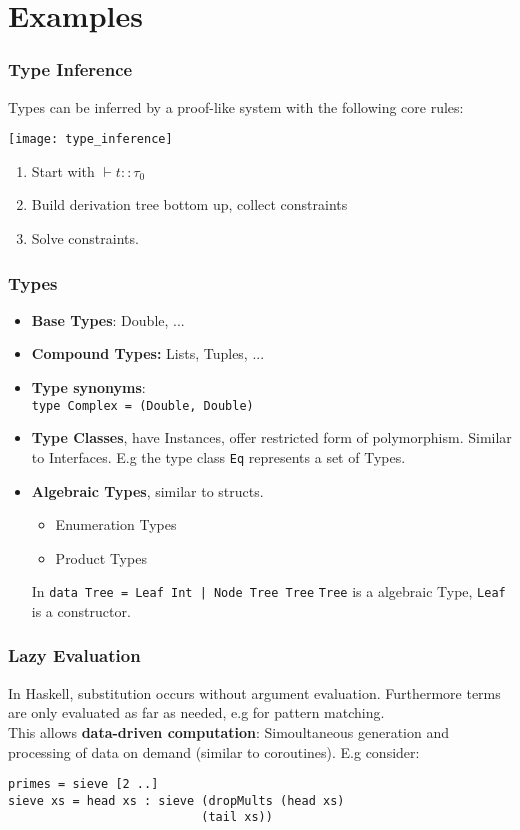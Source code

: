 \part{Examples}

\section{Type Inference}
Types can be inferred by a proof-like system with the following core rules:
\begin{center}
 \texttt{[image: type\_inference]}
\end{center}
\begin{enumerate}
	\item Start with $\vdash t:: \tau_{0}$
	\item Build derivation tree bottom up, collect constraints
	\item Solve constraints.
\end{enumerate}

\section{Types}
\begin{itemize}
	\item \textbf{Base Types}: Double, ...
	\item \textbf{Compound Types:} Lists, Tuples, ...
	\item \textbf{Type synonyms}: \\
		\verb+type Complex = (Double, Double)+
	\item \textbf{Type Classes}, have Instances, offer restricted form of polymorphism. Similar to Interfaces. E.g the type class \verb+Eq+ represents a set of Types.
	\item \textbf{Algebraic Types}, similar to structs.
		\begin{itemize}
			\item Enumeration Types
			\item Product Types
		\end{itemize}
	In \verb+data Tree = Leaf Int | Node Tree Tree+
	\verb+Tree+ is a algebraic Type, \verb+Leaf+ is a constructor.
\end{itemize}

\section{Lazy Evaluation}
In Haskell, substitution occurs without argument evaluation. Furthermore terms are only evaluated as far as needed, e.g for pattern matching.\\
This allows \textbf{data-driven computation}: Simoultaneous generation and processing of data on demand (similar to coroutines). E.g consider:
\begin{lstlisting}
primes = sieve [2 ..]
sieve xs = head xs : sieve (dropMults (head xs) 
                           (tail xs))
\end{lstlisting}
